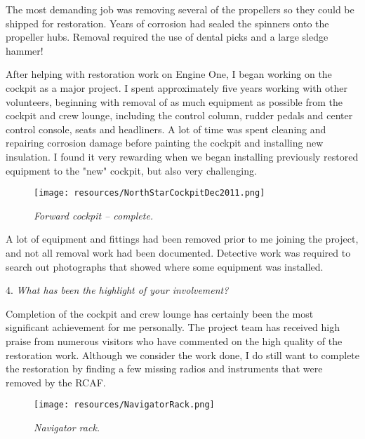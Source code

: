 \begin{multicols}{2}
The most demanding job was removing several of the propellers so they could be shipped for restoration.  Years of corrosion had sealed the spinners onto the propeller hubs.  Removal required the use of dental picks and a large sledge hammer!


After helping with restoration work on Engine One, I began working on
the cockpit as a major project.  I spent approximately five years
working with other volunteers, beginning with removal of as much
equipment as possible from the cockpit and crew lounge, including the
control column, rudder pedals and center control console, seats and
headliners.  A lot of time was spent cleaning and repairing corrosion
damage before painting the cockpit and installing new insulation.  I
found it very rewarding when we began installing previously restored
equipment to the "new" cockpit, but also very challenging. 

\begin{figure}[htbp]
	\vspace{2em}
	\centering
	\texttt{[image: resources/NorthStarCockpitDec2011.png]}
	\caption*{\small \em Forward cockpit -- complete.}
	\label{fig:fwd_cockpit_complete}
\end{figure}

 A lot of equipment and fittings had been removed prior to me joining the project, and not all removal work had been documented.  Detective work was required to search out photographs that showed where some equipment was installed.

4. \textit{What has been the highlight of your involvement?}

Completion of the cockpit and crew lounge has certainly been the most
significant achievement for me personally. The project team has
received high praise from numerous visitors who have commented on the
high quality of the restoration work.  Although we consider the work
done, I do still want to complete the restoration by finding a few
missing radios and instruments that were removed by the RCAF.

\begin{figure}[htbp]
   \vspace{2em}
   \centering
   \texttt{[image: resources/NavigatorRack.png]}
   \caption*{\small \em Navigator rack.}
   \label{fig:nav-radio-rack}
\end{figure}


\end{multicols}

